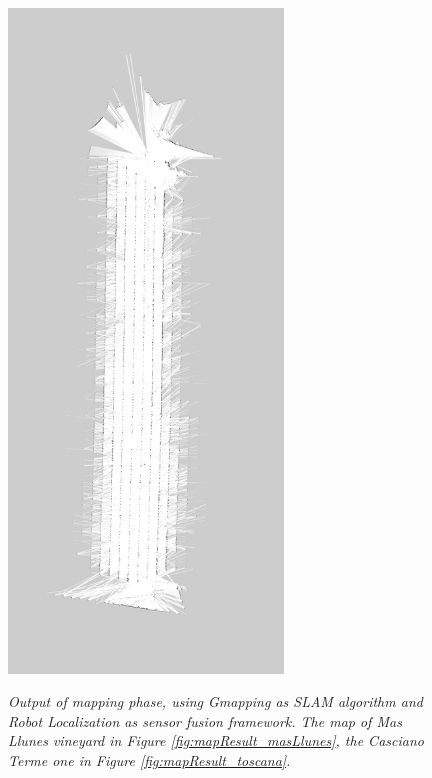 \begin{figure}
\begin{minipage}[c]{.5\textwidth}
{		\includegraphics[width=0.65\textwidth]{Images/experimental_data/toscana_map.png}
		\label{fig:mapResult_toscana}}
	\end{minipage}
	\caption{\textit{Output of mapping phase, using Gmapping as \ac{SLAM} algorithm and Robot Localization as sensor fusion framework. The map of Mas Llunes vineyard in Figure \ref{fig:mapResult_masLlunes}, the Casciano Terme one in Figure \ref{fig:mapResult_toscana}.}}
	\label{fig:mappingResults}
\end{figure}


